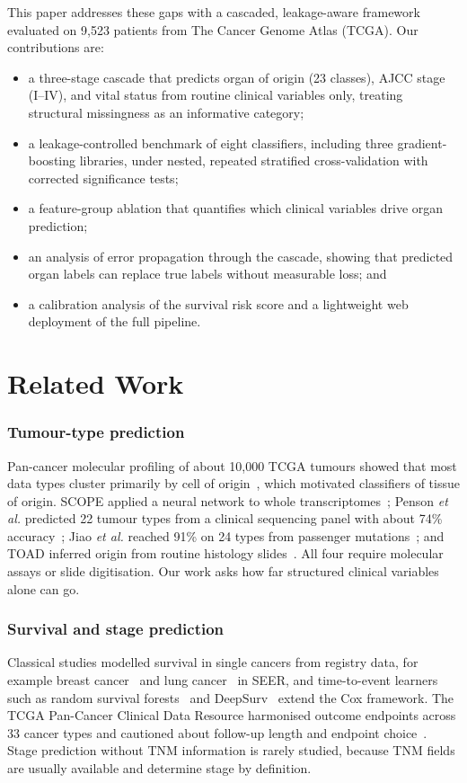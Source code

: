 \documentclass[conference]{IEEEtran}
\begin{document}
This paper addresses these gaps with a cascaded, leakage-aware framework evaluated on 9,523 patients from The Cancer Genome Atlas (TCGA). Our contributions are:
\begin{itemize}
\item a three-stage cascade that predicts organ of origin (23 classes), AJCC stage (I--IV), and vital status from routine clinical variables only, treating structural missingness as an informative category;
\item a leakage-controlled benchmark of eight classifiers, including three gradient-boosting libraries, under nested, repeated stratified cross-validation with corrected significance tests;
\item a feature-group ablation that quantifies which clinical variables drive organ prediction;
\item an analysis of error propagation through the cascade, showing that predicted organ labels can replace true labels without measurable loss; and
\item a calibration analysis of the survival risk score and a lightweight web deployment of the full pipeline.
\end{itemize}

\section{Related Work}
\subsubsection*{Tumour-type prediction}
Pan-cancer molecular profiling of about 10,000 TCGA tumours showed that most data types cluster primarily by cell of origin~\cite{hoadley2018}, which motivated classifiers of tissue of origin. SCOPE applied a neural network to whole transcriptomes~\cite{grewal2019}; Penson \emph{et al.} predicted 22 tumour types from a clinical sequencing panel with about 74\% accuracy~\cite{penson2020}; Jiao \emph{et al.} reached 91\% on 24 types from passenger mutations~\cite{jiao2020}; and TOAD inferred origin from routine histology slides~\cite{lu2021}. All four require molecular assays or slide digitisation. Our work asks how far structured clinical variables alone can go.

\subsubsection*{Survival and stage prediction}
Classical studies modelled survival in single cancers from registry data, for example breast cancer~\cite{delen2005} and lung cancer~\cite{agrawal2012} in SEER, and time-to-event learners such as random survival forests~\cite{ishwaran2008} and DeepSurv~\cite{katzman2018} extend the Cox framework. The TCGA Pan-Cancer Clinical Data Resource harmonised outcome endpoints across 33 cancer types and cautioned about follow-up length and endpoint choice~\cite{liu2018}. Stage prediction without TNM information is rarely studied, because TNM fields are usually available and determine stage by definition.
\end{document}
